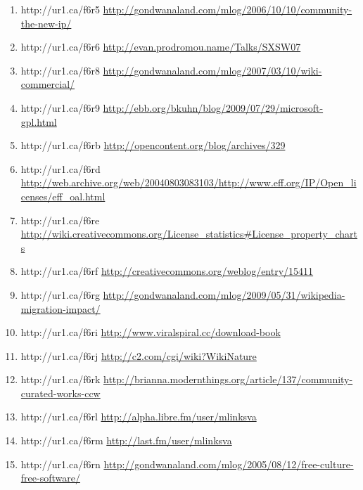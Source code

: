 \begin{enumerate}
    \item{http://ur1.ca/f6r5}
        \url{http://gondwanaland.com/mlog/2006/10/10/community-the-new-ip/}

    \item{http://ur1.ca/f6r6}
        \url{http://evan.prodromou.name/Talks/SXSW07}

    \item{http://ur1.ca/f6r8}
        \url{http://gondwanaland.com/mlog/2007/03/10/wiki-commercial/}

    \item{http://ur1.ca/f6r9}
        \url{http://ebb.org/bkuhn/blog/2009/07/29/microsoft-gpl.html}

    \item{http://ur1.ca/f6rb}
        \url{http://opencontent.org/blog/archives/329}

    \item{http://ur1.ca/f6rd}
        \url{http://web.archive.org/web/20040803083103/http://www.eff.org/IP/Open\_licenses/eff\_oal.html}

    \item{http://ur1.ca/f6re}
        \url{http://wiki.creativecommons.org/License\_statistics#License\_property\_charts}

    \item{http://ur1.ca/f6rf}
        \url{http://creativecommons.org/weblog/entry/15411}

    \item{http://ur1.ca/f6rg}
        \url{http://gondwanaland.com/mlog/2009/05/31/wikipedia-migration-impact/}

    \item{http://ur1.ca/f6ri}
        \url{http://www.viralspiral.cc/download-book}

    \item{http://ur1.ca/f6rj}
        \url{http://c2.com/cgi/wiki?WikiNature}

    \item{http://ur1.ca/f6rk}
        \url{http://brianna.modernthings.org/article/137/community-curated-works-ccw}

    \item{http://ur1.ca/f6rl}
        \url{http://alpha.libre.fm/user/mlinksva}

    \item{http://ur1.ca/f6rm}
        \url{http://last.fm/user/mlinksva}

    \item{http://ur1.ca/f6rn}
        \url{http://gondwanaland.com/mlog/2005/08/12/free-culture-free-software/}


\end{enumerate}
